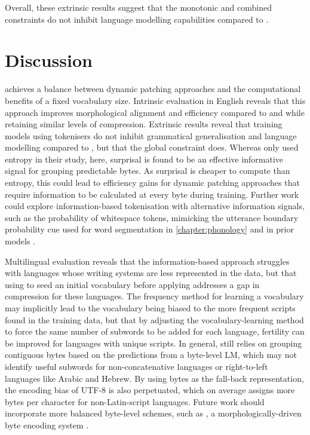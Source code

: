 Overall, these extrinsic results suggest that the monotonic and combined constraints do not inhibit language modelling capabilities compared to \bpe. 

\section{Discussion}\label{sec:16-discussion}

\bytespan achieves a balance between dynamic patching approaches and the computational benefits of a fixed vocabulary size. Intrinsic evaluation in English reveals that this approach improves morphological alignment and \renyi efficiency compared to \bpe and \bpewp while retaining similar levels of compression. Extrinsic results reveal that training models using \bytespan tokenisers do not inhibit grammatical generalisation and language modelling compared to \bpe, but that the global constraint does. Whereas \citet{pagnoni2024byte} only used entropy in their study, here, surprisal is found to be an effective informative signal for grouping predictable bytes. As surprisal is cheaper to compute than entropy, this could lead to efficiency gains for dynamic patching approaches that require information to be calculated at every byte during training. Further work could explore information-based tokenisation with alternative information signals, such as the probability of whitespace tokens, mimicking the utterance boundary probability cue used for word segmentation in \cref{chapter:phonology} and in prior models \citep{christiansen1998learning}.

Multilingual evaluation reveals that the information-based approach struggles with languages whose writing systems are less represented in the data, but that using \bytespan to seed an initial vocabulary before applying \bpe addresses a gap in compression for these languages. The frequency method for learning a vocabulary may implicitly lead to the vocabulary being biased to the more frequent scripts found in the training data, but that by adjusting the vocabulary-learning method to force the same number of subwords to be added for each language, fertility can be improved for languages with unique scripts. In general, \bytespan still relies on grouping contiguous bytes based on the predictions from a byte-level LM, which may not identify useful subwords for non-concatenative languages or right-to-left languages like Arabic and Hebrew. By using bytes as the fall-back representation, the encoding bias of UTF-8 is also perpetuated, which on average assigns more bytes per character for non-Latin-script languages. Future work should incorporate more balanced byte-level schemes, such as , a morphologically-driven byte encoding system \citep{limisiewicz-etal-2024-myte}.

